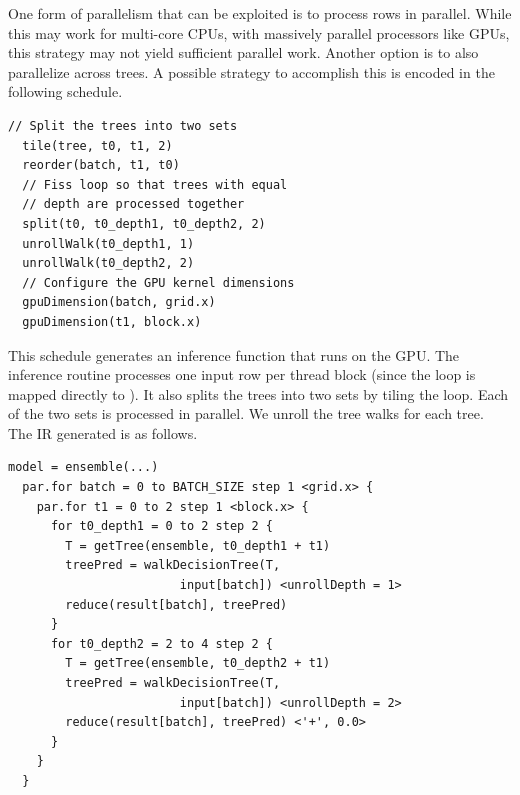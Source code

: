 One form of parallelism that can be exploited is to process rows in 
parallel. 
While this may work for multi-core CPUs, with massively parallel processors like GPUs,
this strategy may not yield sufficient parallel work. Another option is to also 
parallelize across trees. 
A possible strategy to accomplish this is encoded in the following schedule.
\begin{lstlisting}[style=c++]
  // Split the trees into two sets
  tile(tree, t0, t1, 2)
  reorder(batch, t1, t0)
  // Fiss loop so that trees with equal 
  // depth are processed together
  split(t0, t0_depth1, t0_depth2, 2)
  unrollWalk(t0_depth1, 1)
  unrollWalk(t0_depth2, 2)
  // Configure the GPU kernel dimensions
  gpuDimension(batch, grid.x)
  gpuDimension(t1, block.x)
\end{lstlisting}
This schedule generates an inference function that runs on the GPU. 
The inference routine processes one input row per thread block (since the 
loop is mapped directly to ).
It also splits the trees into two sets by tiling the  loop.
Each of the two sets is processed in parallel. We unroll the tree walks 
for each tree. The IR generated is as follows. 
\begin{lstlisting}[style=c++]
  model = ensemble(...)
  par.for batch = 0 to BATCH_SIZE step 1 <grid.x> {
    par.for t1 = 0 to 2 step 1 <block.x> {
      for t0_depth1 = 0 to 2 step 2 {
        T = getTree(ensemble, t0_depth1 + t1)
        treePred = walkDecisionTree(T, 
                        input[batch]) <unrollDepth = 1>
        reduce(result[batch], treePred)
      }
      for t0_depth2 = 2 to 4 step 2 {
        T = getTree(ensemble, t0_depth2 + t1)
        treePred = walkDecisionTree(T,
                        input[batch]) <unrollDepth = 2>
        reduce(result[batch], treePred) <'+', 0.0>
      }
    }
  }
\end{lstlisting}

